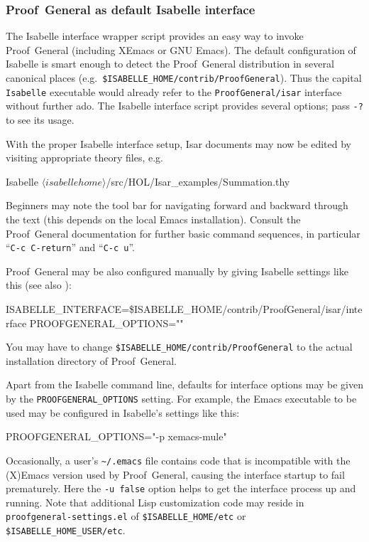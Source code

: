 \subsubsection{Proof~General as default Isabelle interface}

The Isabelle interface wrapper script provides an easy way to invoke
Proof~General (including XEmacs or GNU Emacs).  The default
configuration of Isabelle is smart enough to detect the Proof~General
distribution in several canonical places (e.g.\ 
\texttt{\$ISABELLE_HOME/contrib/ProofGeneral}).  Thus the capital
\texttt{Isabelle} executable would already refer to the
\texttt{ProofGeneral/isar} interface without further ado.  The
Isabelle interface script provides several options; pass \verb,-?, to
see its usage.

With the proper Isabelle interface setup, Isar documents may now be edited by
visiting appropriate theory files, e.g.\ 
\begin{ttbox}
Isabelle \({\langle}isabellehome{\rangle}\)/src/HOL/Isar_examples/Summation.thy
\end{ttbox}
Beginners may note the tool bar for navigating forward and backward through
the text (this depends on the local Emacs installation).  Consult the
Proof~General documentation \cite{proofgeneral} for further basic command
sequences, in particular ``\texttt{C-c C-return}'' and ``\texttt{C-c u}''.

\medskip

Proof~General may be also configured manually by giving Isabelle settings like
this (see also \cite{isabelle-sys}):
\begin{ttbox}
ISABELLE_INTERFACE=\$ISABELLE_HOME/contrib/ProofGeneral/isar/interface
PROOFGENERAL_OPTIONS=""
\end{ttbox}
You may have to change \texttt{\$ISABELLE_HOME/contrib/ProofGeneral} to the
actual installation directory of Proof~General.

\medskip

Apart from the Isabelle command line, defaults for interface options may be
given by the \texttt{PROOFGENERAL_OPTIONS} setting.  For example, the Emacs
executable to be used may be configured in Isabelle's settings like this:
\begin{ttbox}
PROOFGENERAL_OPTIONS="-p xemacs-mule"  
\end{ttbox}

Occasionally, a user's \verb,~/.emacs, file contains code that is incompatible
with the (X)Emacs version used by Proof~General, causing the interface startup
to fail prematurely.  Here the \texttt{-u false} option helps to get the
interface process up and running.  Note that additional Lisp customization
code may reside in \texttt{proofgeneral-settings.el} of
\texttt{\$ISABELLE_HOME/etc} or \texttt{\$ISABELLE_HOME_USER/etc}.


